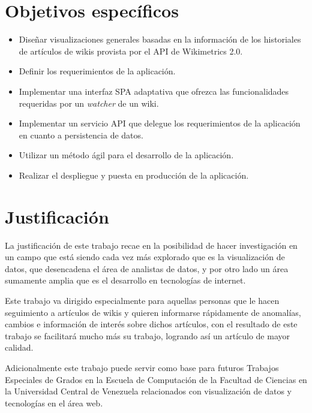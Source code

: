 \section{Objetivos específicos}
\begin{itemize}
\item{Diseñar visualizaciones generales basadas en la información de los historiales de artículos de wikis provista por el API de Wikimetrics 2.0.}
\item{Definir los requerimientos de la aplicación.}
\item{Implementar una interfaz SPA adaptativa que ofrezca las funcionalidades requeridas por un \textit{watcher} de un wiki.}
\item{Implementar un servicio API que delegue los requerimientos de la aplicación en cuanto a persistencia de datos.}
\item{Utilizar un método ágil para el desarrollo de la aplicación.}
\item{Realizar el despliegue y puesta en producción de la aplicación.}
\end{itemize}

\section{Justificación}
La justificación de este trabajo recae en la posibilidad de hacer investigación en un campo que está siendo cada vez más explorado que es la visualización de datos, que desencadena el área de analistas de datos, y por otro lado un área sumamente amplia que es el desarrollo en tecnologías de internet. 

Este trabajo va dirigido especialmente para aquellas personas que le hacen seguimiento a artículos de wikis y quieren informarse rápidamente de anomalías, cambios e información de interés sobre dichos artículos, con el resultado de este trabajo se facilitará mucho más su trabajo, logrando así un artículo de mayor calidad.

Adicionalmente este trabajo puede servir como base para futuros Trabajos Especiales de Grados en la Escuela de Computación de la Facultad de Ciencias en la Universidad Central de Venezuela relacionados con visualización de datos y tecnologías en el área web.

